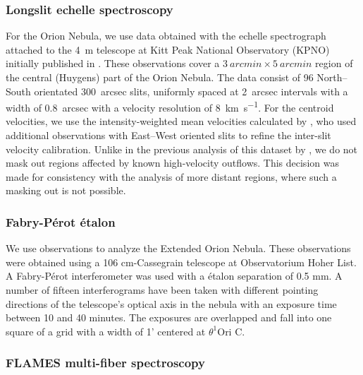 \documentclass[fleqn,usenatbib, useAMS, a4paper]{mnras}
\begin{document}
\subsubsection{Longslit echelle spectroscopy}
\label{sec:longsl-echelle-spect}

For the Orion Nebula, we use data obtained with the echelle spectrograph attached to the \SI{4}{m} telescope at Kitt Peak National Observatory (KPNO) initially published in
\citet{Doi:2004a}.
These observations cover a \(\SI{3}{arcmin} \times \SI{5}{arcmin}\) region of the
central (Huygens) part of the Orion Nebula.
The data consist of 96 North--South orientated \SI{300}{arcsec} slits,
uniformly spaced at \SI{2}{arcsec} intervals with a width of \SI{0.8}{arcsec}
with a velocity resolution of \SI{8}{km.s^{-1}}. 
For the centroid velocities, we use the intensity-weighted 
mean velocities calculated by \citet{Garcia-Diaz:2008a},
who used additional observations with East--West oriented slits
to refine the inter-slit velocity calibration. 
Unlike in the previous analysis of this dataset by \citet{arthur2016turbulence},
we do not mask out regions affected by known high-velocity outflows.
This decision was made for consistency with the analysis of more distant regions,
where such a masking out is not possible.

\subsubsection{Fabry-Pérot étalon}
\label{sec:fabry-perot-etalaon}

We use \citet{1987A&A...176..347H} observations to analyze the Extended Orion Nebula.
These observations were obtained using a 106 cm-Cassegrain telescope at Observatorium Hoher List. 
A Fabry-Pérot interferometer was used with a étalon separation of 0.5 mm. 
A number of fifteen interferograms have been taken with different pointing directions of the telescope's optical axis in the nebula with an exposure time between 10 and 40 minutes. 
The exposures are overlapped and fall into one square of a grid with a width of 1' centered at \(\theta^{1}\)Ori C.   

\subsubsection{FLAMES multi-fiber spectroscopy}
\label{sec:flames-multi-fiber}
\end{document}
